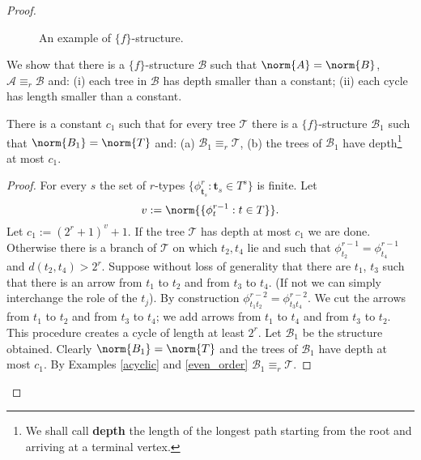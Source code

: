 \begin{lem}
\begin{proof}
\begin{figure}
\caption{An example of $\{f\}$-structure.}
\end{figure}

We show that there is a $\{f\}$-structure $\mathcal{B}$ such that $\norm{A}=\norm{B}$, $\mathcal{A} \equiv_r \mathcal{B}$ and: (i) each tree in $\mathcal{B}$ has depth smaller than a constant; (ii) each cycle has length smaller than a constant. 

\begin{claim} There is a constant $c_1$ such that for every tree $\mathcal{T}$ there is a $\{f\}$-structure $\mathcal{B}_1$ such that $\norm{B_1}=\norm{T}$ and: (a) $\mathcal{B}_1 \equiv_r \mathcal{T}$, (b) the trees of $\mathcal{B}_1$ have depth\footnote{We shall call \textbf{depth} the length of the longest path starting from the root and arriving at a terminal vertex.} at most $c_1$.
\begin{proof} 
For every $s$ the set of $r$-types $\{\phi^{r} _{\mathbf{t}_s } : \mathbf{t}_s \in T^s\}$ is finite. Let $$v:=\norm{\{\phi^{r-1} _{t} : t \in T\}}\text{.}$$ 
Let $c_1:=(2^r +1)^v +1$. 
If the tree $\mathcal{T}$ has depth at most $c_1$ we are done. 
Otherwise there is a branch of $\mathcal{T}$ on which $t_2, t_4$ lie and such that $\phi^{r-1} _{t_2} = \phi^{r-1} _{t_4}$ and $d(t_2, t_4) > 2^r$. 
Suppose without loss of generality that there are $t_1$, $t_3$ such that there is an arrow from $t_1$ to $t_2$ and from $t_3$ to $t_4$. 
(If not we can simply interchange the role of the $t_j$). 
By construction $\phi^{r-2} _{t_1 t_2} = \phi^{r-2} _{t_3 t_4}$. 
We cut the arrows from $t_1$ to $t_2$ and from $t_3$ to $t_4$; we add arrows from $t_1$ to $t_4$ and from $t_3$ to $t_2$. 
This procedure creates a cycle of length at least $2^r$. 
Let $\mathcal{B}_1$ be the structure obtained. 
Clearly $\norm{B_1}=\norm{T}$ and the trees of $\mathcal{B}_1$ have depth at most $c_1$. 
By Examples \ref{acyclic} and \ref{even_order} $\mathcal{B}_1 \equiv_r \mathcal{T}$. 
\end{proof}
\end{claim}


\end{proof}
\end{lem}
